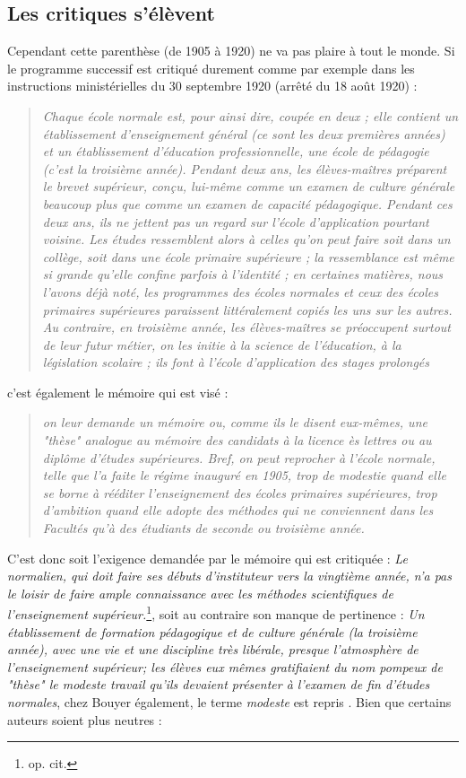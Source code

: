 \documentclass[a4paper,11pt]{article}
\begin{document}
			  \subsection{Les critiques s'élèvent}
			  Cependant cette parenthèse (de 1905 à 1920) ne va pas plaire à tout le monde. Si le programme successif est critiqué durement comme par exemple dans les instructions ministérielles du 30 septembre 1920 (arrêté du 18 août 1920) :
			  \begin{quote}
			\emph{Chaque école normale est, pour ainsi dire, coupée en deux ; elle contient un établissement d'enseignement général (ce sont les deux premières années) et un établissement d'éducation professionnelle, une école de pédagogie (c'est la troisième année). Pendant deux ans, les élèves-maîtres préparent le brevet supérieur, conçu, lui-même comme un examen de culture générale beaucoup plus que comme un examen de capacité pédagogique. Pendant ces deux ans, ils ne jettent pas un regard sur l'école d'application pourtant voisine. Les études ressemblent alors à celles qu'on peut faire soit dans un collège, soit dans une école primaire supérieure ; la ressemblance est même si grande qu'elle confine parfois à l'identité ; en certaines matières, nous l'avons déjà noté, les programmes des écoles normales et ceux des écoles primaires supérieures paraissent littéralement copiés les uns sur les autres. Au contraire, en troisième année, les élèves-maîtres se préoccupent surtout de leur futur métier, on les initie à la science de l'éducation, à la législation scolaire ; ils font à l'école d'application des stages prolongés}
			  \end{quote}
			  c'est également le mémoire qui est visé : 
			  \begin{quote}
			  \emph{ on leur demande un mémoire ou, comme ils le disent eux-mêmes, une "thèse" analogue au mémoire des candidats à la licence ès lettres ou au diplôme d'études supérieures. Bref, on peut reprocher à l'école normale, telle que l'a faite le régime inauguré en 1905, trop de modestie quand elle se borne à rééditer l'enseignement des écoles primaires supérieures, trop d'ambition quand elle adopte des méthodes qui ne conviennent dans les Facultés qu'à des étudiants de seconde ou troisième année.}
			  \end{quote}
			  C'est donc soit l'exigence demandée par le mémoire qui est critiquée : \emph{Le normalien, qui doit faire ses débuts d'instituteur vers la vingtième année, n'a pas le loisir de faire ample connaissance avec les méthodes scientifiques de l'enseignement supérieur.}\footnote{op. cit.}, soit au contraire son manque de pertinence \cite[p. 114]{gon54} : \emph{Un établissement de formation pédagogique et de culture générale (la troisième année), avec une vie et une discipline très libérale, presque l'atmosphère de l'enseignement supérieur; les élèves eux mêmes gratifiaient du nom pompeux de "thèse" le modeste travail qu'ils devaient présenter à l'examen de fin d'études normales}, chez Bouyer également, le terme \emph{modeste} est repris \cite{bou03}. Bien que certains auteurs soient plus neutres : 
\end{document}
